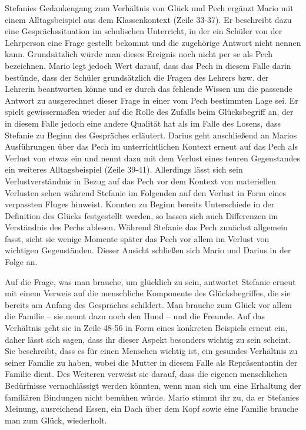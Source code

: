 Stefanies Gedankengang zum Verhältnis von Glück und Pech ergänzt Mario mit einem Alltagsbeispiel aus dem Klassenkontext (Zeile 33-37). 
Er beschreibt dazu eine Gesprächssituation im schulischen Unterricht, in der ein Schüler von der Lehrperson eine Frage gestellt bekommt und die zugehörige Antwort nicht nennen kann. 
Grundsätzlich würde man dieses Ereignis noch nicht per se als Pech bezeichnen. 
Mario legt jedoch Wert darauf, dass das Pech in diesem Falle darin bestünde, dass der Schüler grundsätzlich die Fragen des Lehrers bzw. der Lehrerin beantworten könne und er durch das fehlende Wissen um die passende Antwort zu ausgerechnet dieser Frage in einer vom Pech bestimmten Lage sei.  
Er spielt gewissermaßen wieder auf die Rolle des Zufalls beim Glücksbegriff an, der in diesem Falle jedoch eine andere Qualität hat als im Falle des Losens, dass Stefanie zu Beginn des Gespräches erläutert. 
Darius geht anschließend an Marios Ausführungen über das Pech im unterrichtlichen Kontext erneut auf das Pech als Verlust von etwas ein und nennt dazu mit dem Verlust eines teuren Gegenstandes ein weiteres Alltagsbeispiel (Zeile 39-41).
Allerdings lässt sich sein Verlustverständnis in Bezug auf das Pech vor dem Kontext von materiellen Verlusten sehen während Stefanie im Folgenden auf den Verlust in Form eines verpassten Fluges hinweist. 
Konnten zu Beginn bereits Unterschiede in der Definition des Glücks festgestellt werden, so lassen sich auch Differenzen im Verständnis des Pechs ablesen. 
Während Stefanie das Pech zunächst allgemein fasst, sieht sie wenige Momente später das Pech vor allem im Verlust von wichtigen Gegenständen. 
Dieser Ansicht schließen sich Mario und Darius in der Folge an.

Auf die Frage, was man brauche, um glücklich zu sein, antwortet Stefanie erneut mit einem Verweis auf die menschliche Komponente des Glücksbegriffes, die sie bereits am Anfang des Gespräches schildert. 
Man brauche zum Glück vor allem die Familie -- sie nennt dazu noch den Hund -- und die Freunde. 
Auf das Verhältnis geht sie in Zeile 48-56 in Form eines konkreten Beispiels erneut ein, daher lässt sich sagen, dass ihr dieser Aspekt besonders wichtig zu sein scheint. 
Sie beschreibt, dass es für einen Menschen wichtig ist, ein gesundes Verhältnis zu seiner Familie zu haben, wobei die Mutter in diesem Falle als Repräsentantin der Familie dient. 
Des Weiteren verweist sie darauf, dass die eigenen menschlichen Bedürfnisse vernachlässigt werden könnten, wenn man sich um eine Erhaltung der familiären Bindungen nicht bemühen würde.
Mario stimmt ihr zu, da er Stefanies Meinung, ausreichend Essen, ein Dach über dem Kopf sowie eine Familie brauche man zum Glück, wiederholt. 

